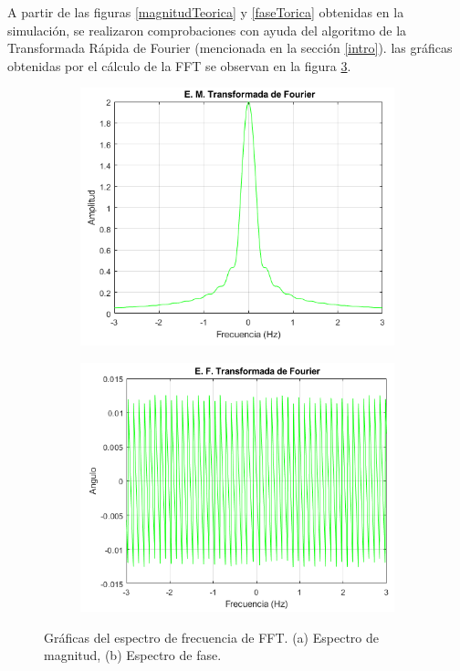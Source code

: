 \documentclass[11pt,letterpaper,twocolumn]{article}
\begin{document}
        A partir de las figuras \ref{magnitudTeorica} y \ref{faseTorica} obtenidas en la simulación, se 
        realizaron comprobaciones con ayuda del algoritmo de la Transformada Rápida de Fourier (mencionada
        en la sección \ref{intro}). las gráficas obtenidas por el cálculo de la FFT se observan en la figura
        \ref{espectroFFT}.
        
        \begin{figure}[H]
            \centering 
            \begin{subfigure}[h]{0.49\linewidth}
                \includegraphics[width=\linewidth]{img/EMagnitudTF_FFT.png}
                \caption{}
                \label{magnitudFFT}
            \end{subfigure}
            \begin{subfigure}[h]{0.49\linewidth}
                \includegraphics[width=\linewidth]{img/EFaseTF_FFT.png}
                \caption{}
                \label{faseFFT}
            \end{subfigure}
            \caption{Gráficas del espectro de frecuencia de FFT. (a) Espectro de magnitud, (b) Espectro de 
                    fase.}
            \label{espectroFFT}
        \end{figure}
\end{document}
